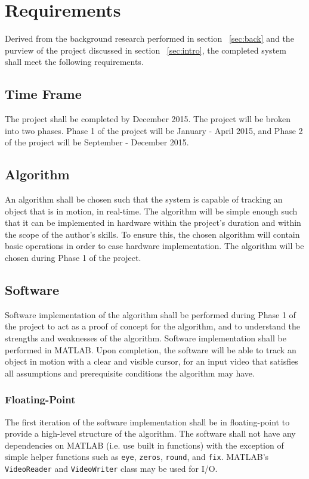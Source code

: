 \documentclass[11pt]{article} %
\begin{document}
\section{Requirements}
Derived from the background research performed in section ~\ref{sec:back} and the purview of the project discussed in section ~\ref{sec:intro}, the completed system shall meet the following requirements.
\subsection{Time Frame}
The project shall be completed by December 2015. The project will be broken into two phases. Phase 1 of the project will be January - April 2015, and Phase 2 of the project will be September - December 2015.
\subsection{Algorithm}
An algorithm shall be chosen such that the system is capable of tracking an object that is in motion, in real-time. The algorithm will be simple enough such that it can be implemented in hardware within the project's duration and within the scope of the author's skills. To ensure this, the chosen algorithm will contain basic operations in order to ease hardware implementation. The algorithm will be chosen during Phase 1 of the project.
\subsection{Software}
Software implementation of the algorithm shall be performed during Phase 1 of the project to act as a proof of concept for the algorithm, and to understand the strengths and weaknesses of the algorithm. Software implementation shall be performed in MATLAB. Upon completion, the software will be able to track an object in motion with a clear and visible cursor, for an input video that satisfies all assumptions and prerequisite conditions the algorithm may have. 
\subsubsection{Floating-Point}
The first iteration of the software implementation shall be in floating-point to provide a high-level structure of the algorithm. The software shall not have any dependencies on MATLAB (i.e. use built in functions) with the exception of simple helper functions such as \texttt{eye}, \texttt{zeros}, \texttt{round}, and \texttt{fix}. MATLAB's \texttt{VideoReader} and \texttt{VideoWriter} class may be used for I/O.
\end{document}
